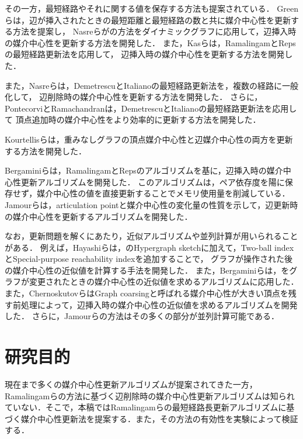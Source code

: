 その一方，最短経路やそれに関する値を保存する方法も提案されている．
Greenら\cite{Green2012}は，辺が挿入されたときの最短距離と最短経路の数と共に媒介中心性を更新する方法を提案し，
Nasreらが\cite{Karger1993}の方法をダイナミックグラフに応用して，辺挿入時の媒介中心性を更新する方法を開発した\cite{Nasre2014a}．
また，Kasら\cite{Kas2013}は，RamalingamとRepsの最短経路更新法\cite{Ramalingam1996}を応用して，
辺挿入時の媒介中心性を更新する方法を開発した．

また，Nasreら\cite{Nasre2014b}は，DemetrescuとItalianoの最短経路更新法\cite{Demetrescu2003}を，複数の経路に一般化して，
辺削除時の媒介中心性を更新する方法を開発した．
さらに，PontecorviとRamachandran\cite{Pontecorvi2015}は，DemetrescuとItalianoの最短経路更新法を応用して
頂点追加時の媒介中心性をより効率的に更新する方法を開発した．

Kourtellisらは，重みなしグラフの頂点媒介中心性と辺媒介中心性の両方を更新する方法を開発した\cite{Kourtellis2015}．

Bergaminiらは，RamalingamとRepsのアルゴリズムを基に，辺挿入時の媒介中心性更新アルゴリズムを開発した\cite{Bergamini2017}．
このアルゴリズムは，ペア依存度を陽に保存せず，媒介中心性の値を直接更新することでメモリ使用量を削減している．
Jamourらは，articulation pointと媒介中心性の変化量の性質を示して，辺更新時の媒介中心性を更新するアルゴリズムを開発した\cite{Jamour2017}．

なお，更新問題を解くにあたり，近似アルゴリズムや並列計算が用いられることがある．
例えば，Hayashiらは，\cite{Yoshida2014}のHypergraph sketchに加えて，Two-ball indexとSpecial-purpose reachability indexを追加することで，
グラフが操作された後の媒介中心性の近似値を計算する手法を開発した\cite{Hayashi2015}．
また，Bergaminiらは，\cite{Riondato2014}をグラフが変更されたときの媒介中心性の近似値を求めるアルゴリズムに応用した\cite{Bergamini2015a,Bergamini2015b}．
また，ChernoskutovらはGraph coarsingと呼ばれる媒介中心性が大きい頂点を残す前処理によって，辺挿入時の媒介中心性の近似値を求めるアルゴリズムを開発した\cite{Chernoskutov2015}．
さらに，Jamourらの方法\cite{Jamour2017}はその多くの部分が並列計算可能である．

\section{研究目的}
現在まで多くの媒介中心性更新アルゴリズムが提案されてきた一方，
Ramalingamらの方法に基づく辺削除時の媒介中心性更新アルゴリズムは知られていない．そこで，本稿ではRamalingamらの最短経路長更新アルゴリズムに基づく媒介中心性更新法を提案する．また，その方法の有効性を実験によって検証する．

